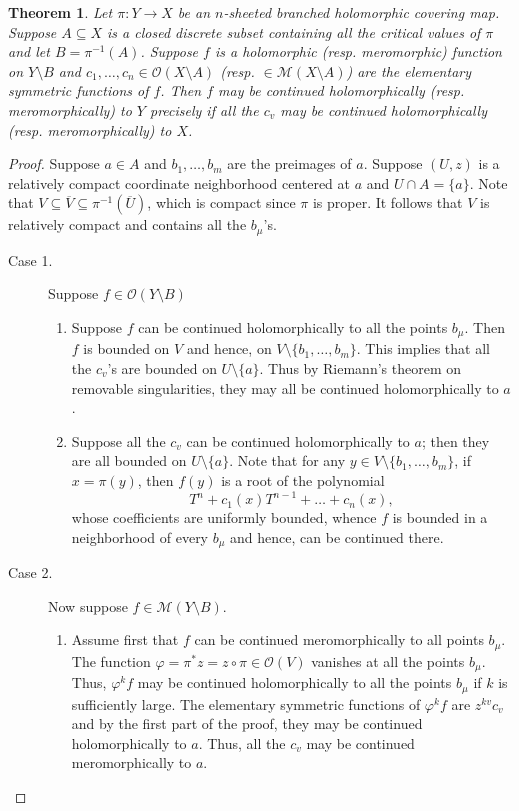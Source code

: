 \documentclass[12pt]{article}
\theoremstyle{thmstyle}
\newtheorem{theorem}{Theorem}[section]
\theoremstyle{defstyle}
\newcommand{\scrO}{\mathscr{O}}
\newcommand{\scrM}{\mathscr{M}}
\begin{document}
\begin{theorem}
    Let $\pi: Y\to X$ be an $n$-sheeted branched holomorphic covering map. Suppose $A\subseteq X$ is a closed discrete subset containing all the critical values of $\pi$ and let $B = \pi^{-1}(A)$. Suppose $f$ is a holomorphic (resp. meromorphic) function on $Y\setminus B$ and $c_1,\dots, c_n\in\scrO(X\setminus A)$ (resp. $\in\scrM(X\setminus A)$) are the elementary symmetric functions of $f$. Then $f$ may be continued holomorphically (resp. meromorphically) to $Y$ precisely if all the $c_v$ may be continued holomorphically (resp. meromorphically) to $X$.
\end{theorem}
\begin{proof}
    Suppose $a\in A$ and $b_1,\dots, b_m$ are the preimages of $a$. Suppose $(U, z)$ is a relatively compact coordinate neighborhood centered at $a$ and $U\cap A = \{a\}$. Note that $V\subseteq\overline V\subseteq\pi^{-1}(\overline U)$, which is compact since $\pi$ is proper. It follows that $V$ is relatively compact and contains all the $b_\mu$'s.

    \begin{description}
    \item[Case 1.] Suppose $f\in\scrO(Y\setminus B)$
    \begin{enumerate}[label=(\alph*)]
        \item Suppose $f$ can be continued holomorphically to all the points $b_\mu$. Then $f$ is bounded on $V$ and hence, on $V\setminus\{b_1,\dots,b_m\}$. This implies that all the $c_v$'s are bounded on $U\setminus\{a\}$. Thus by Riemann's theorem on removable singularities, they may all be continued holomorphically to $a$.

        \item Suppose all the $c_v$ can be continued holomorphically to $a$; then they are all bounded on $U\setminus\{a\}$. Note that for any $y\in V\setminus\{b_1,\dots, b_m\}$, if $x = \pi(y)$, then $f(y)$ is a root of the polynomial 
        \begin{equation*}
            T^n + c_1(x)T^{n - 1} + \dots + c_n(x),
        \end{equation*}
        whose coefficients are uniformly bounded, whence $f$ is bounded in a neighborhood of every $b_\mu$ and hence, can be continued there.
    \end{enumerate}

    \item[Case 2.] Now suppose $f\in\scrM(Y\setminus B)$.
    \begin{enumerate}[label=(\alph*)]
        \item Assume first that $f$ can be continued meromorphically to all points $b_\mu$. The function $\varphi = \pi^\ast z = z\circ\pi\in\scrO(V)$ vanishes at all the points $b_\mu$. Thus, $\varphi^kf$ may be continued holomorphically to all the points $b_\mu$ if $k$ is sufficiently large. The elementary symmetric functions of $\varphi^kf$ are $z^{kv}c_v$ and by the first part of the proof, they may be continued holomorphically to $a$. Thus, all the $c_v$ may be continued meromorphically to $a$.


\end{enumerate}
\end{description}
\end{proof}
\end{document}
